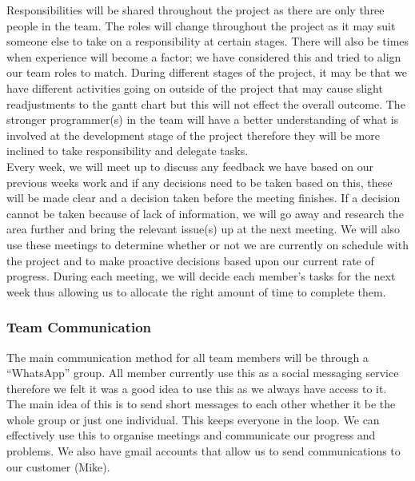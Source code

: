 Responsibilities will be shared throughout the project as there are only three people in the team.  The roles will change throughout the project as it may suit someone else to take on a responsibility at certain stages.  There will also be times when experience will become a factor; we have considered this and tried to align our team roles to match.  During different stages of the project, it may be that we have different activities going on outside of the project that may cause slight readjustments to the gantt chart but this will not effect the overall outcome.  The stronger programmer(s) in the team will have a better understanding of what is involved at the development stage of the project therefore they will be more inclined to take responsibility and delegate tasks.  \\
Every week, we will meet up to discuss any feedback we have based on our previous weeks work and if any decisions need to be taken based on this, these will be made clear and a decision taken before the meeting finishes.  If a decision cannot be taken because of lack of information, we will go away and research the area further and bring the relevant issue(s) up at the next meeting.  We will also use these meetings to determine whether or not we are currently on schedule with the project and to make proactive decisions based upon our current rate of progress.  During each meeting, we will decide each member's tasks for the next week thus allowing us to allocate the right amount of time to complete them.

\subsubsection{Team Communication}
The main communication method for all team members will be through a ``WhatsApp'' group.  All member currently use this as a social messaging service therefore we felt it was a good idea to use this as we always have access to it.  The main idea of this is to send short messages to each other whether it be the whole group or just one individual.  This keeps everyone in the loop.  We can effectively use this to organise meetings and communicate our progress and problems.  We also have gmail accounts that allow us to send communications to our customer (Mike).  \\

